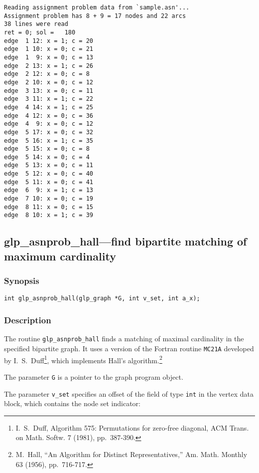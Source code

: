 \documentclass[dvipdfm,11pt]{report}
\begin{document}
\begin{footnotesize}
\begin{verbatim}
Reading assignment problem data from `sample.asn'...
Assignment problem has 8 + 9 = 17 nodes and 22 arcs
38 lines were read
ret = 0; sol =   180
edge  1 12: x = 1; c = 20
edge  1 10: x = 0; c = 21
edge  1  9: x = 0; c = 13
edge  2 13: x = 1; c = 26
edge  2 12: x = 0; c = 8
edge  2 10: x = 0; c = 12
edge  3 13: x = 0; c = 11
edge  3 11: x = 1; c = 22
edge  4 14: x = 1; c = 25
edge  4 12: x = 0; c = 36
edge  4  9: x = 0; c = 12
edge  5 17: x = 0; c = 32
edge  5 16: x = 1; c = 35
edge  5 15: x = 0; c = 8
edge  5 14: x = 0; c = 4
edge  5 13: x = 0; c = 11
edge  5 12: x = 0; c = 40
edge  5 11: x = 0; c = 41
edge  6  9: x = 1; c = 13
edge  7 10: x = 0; c = 19
edge  8 11: x = 0; c = 15
edge  8 10: x = 1; c = 39
\end{verbatim}
\end{footnotesize}

\newpage

\subsection{glp\_asnprob\_hall---find bipartite matching of maximum
cardinality}

\subsubsection*{Synopsis}

\begin{verbatim}
int glp_asnprob_hall(glp_graph *G, int v_set, int a_x);
\end{verbatim}

\subsubsection*{Description}

The routine \verb|glp_asnprob_hall| finds a matching of maximal
cardinality in the specified bipartite graph. It uses a version of the
Fortran routine \verb|MC21A| developed by
I.~S.~Duff\footnote{I.~S.~Duff, Algorithm 575: Permutations for
zero-free diagonal, ACM Trans. on Math. Softw. 7 (1981), pp.~387-390.},
which implements Hall's algorithm.\footnote{M.~Hall, ``An Algorithm for
Distinct Representatives,'' Am. Math. Monthly 63 (1956), pp.~716-717.}

The parameter \verb|G| is a pointer to the graph program object.

The parameter \verb|v_set| specifies an offset of the field of type
\verb|int| in the vertex data block, which contains the node set
indicator:
\end{document}
